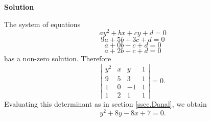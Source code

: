 \begin{enumerate}
\noindent \textbf{Solution}

The system of equations
$$ay^2+bx+cy+d=0$$
$$9a+5b+3c+d=0$$
$$a+0b-c+d=0$$
$$a+2b+c+d=0$$ has a non-zero solution.  Therefore
$$\left| \begin{array}{cccc} y^2&x&y&1\\
9&5&3&1\\
1&0&-1&1\\
1&2&1&1\end{array} \right|=0.$$ Evaluating this determinant as in
section \ref{ssec.Danal}, we obtain
$$y^2+8y-8x+7=0.$$
\end{enumerate}


